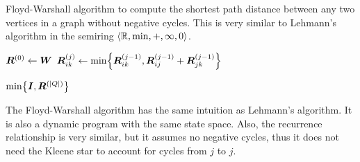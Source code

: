 \begin{algorithm}
  \caption{Floyd-Warshall algorithm to compute the shortest path distance
  between any two vertices in a graph without negative cycles. This is very
  similar to Lehmann's algorithm in the semiring $\langle \mathbb{R}, \min, +, \infty,
  0 \rangle$.}
  \label{alg:floyd-warshall}

  \begin{algorithmic}[1]
      \State $\bm{R}^{(0)} \gets \bm{W}$
            \State $\mat{R}_{ik}^{(j)} \gets \min \lft\{ \mat{R}_{ik}^{(j-1)}, \mat{R}_{ij}^{(j-1)} + \mat{R}_{jk}^{(j-1)} \rgt\}$
          \EndFor
        \EndFor
      \EndFor

      \State \Return $\min \lft\{ \mat{I}, \mat{R}^{(|Q|)} \rgt\}$
    \EndFunction
  \end{algorithmic}
\end{algorithm}

The Floyd-Warshall algorithm \citep{floyd1962algorithm,warshall1962theorem} has
the same intuition as Lehmann's algorithm. It is also a dynamic program with
the same state space. Also, the recurrence relationship is very similar, but it
assumes no negative cycles, thus it does not need the Kleene star to account
for cycles from $j$ to $j$.
